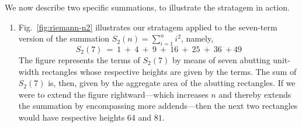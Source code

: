 \bigskip

\noindent
We now describe two specific summations, to illustrate the stratagem in action.

\begin{enumerate}
\item
Fig.~\ref{fig:riemann-n2} illustrates our stratagem applied to the seven-term version of the summation $S_2(n) = \sum_{i=1}^n i^2$, namely,
\[ S_2(7) \ = \ 1 \ + \ 4 \ + \ 9 \ + \ 16 \ + \ 25 \ + \ 36 \ +  49 \]
The figure represents the terms of $S_2(7)$ by means of seven abutting unit-width rectangles whose respective heights are given by the terms.  The sum of $S_2(7)$ is, then, given by the aggregate area of the abutting rectangles.  If we were to extend the figure rightward---which increases $n$ and thereby extends the summation by encompassing more addends---then the next two rectangles would have respective heights $64$ and $81$.

\smallskip


\end{enumerate}
